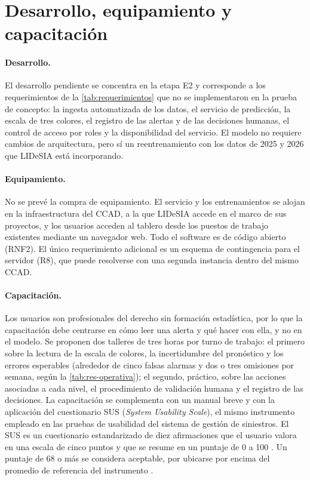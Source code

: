 \section{Desarrollo, equipamiento y capacitación}\label{sec:impl-recursos}

\paragraph{Desarrollo.} El desarrollo pendiente se concentra en la etapa E2 y
corresponde a los requerimientos de la \cref{tab:requerimientos} que no se implementaron
en la prueba de concepto: la ingesta automatizada de los datos, el servicio de
predicción, la escala de tres colores, el registro de las alertas y de las decisiones
humanas, el control de acceso por roles y la disponibilidad del servicio. El modelo no
requiere cambios de arquitectura, pero sí un reentrenamiento con los datos de 2025 y
2026 que LIDeSIA está incorporando.

\paragraph{Equipamiento.} No se prevé la compra de equipamiento. El servicio y los
entrenamientos se alojan en la infraestructura del CCAD, a la que LIDeSIA accede en el
marco de sus proyectos, y los usuarios acceden al tablero desde los puestos de trabajo
existentes mediante un navegador web. Todo el software es de código abierto (RNF2). El
único requerimiento adicional es un esquema de contingencia para el servidor (R8), que
puede resolverse con una segunda instancia dentro del mismo CCAD.

\paragraph{Capacitación.} Los usuarios son profesionales del derecho sin formación
estadística, por lo que la capacitación debe centrarse en cómo leer una alerta y qué
hacer con ella, y no en el modelo. Se proponen dos talleres de tres horas por turno de
trabajo: el primero sobre la lectura de la escala de colores, la incertidumbre del
pronóstico y los errores esperables (alrededor de cinco falsas alarmas y dos o tres
omisiones por semana, según la \cref{tab:res-operativa}); el segundo, práctico, sobre las
acciones asociadas a cada nivel, el procedimiento de validación humana y el registro de
las decisiones. La capacitación se complementa con un manual breve y con la aplicación del
cuestionario SUS (\textit{System Usability Scale}), el mismo instrumento empleado en las
pruebas de usabilidad del sistema de gestión de siniestros. El SUS es un cuestionario
estandarizado de diez afirmaciones que el usuario valora en una escala de cinco puntos y
que se resume en un puntaje de 0 a 100 \parencite{brooke1996}. Un puntaje de 68 o más
se considera aceptable, por ubicarse por encima del promedio de referencia del
instrumento \parencite{sauro2011}.

